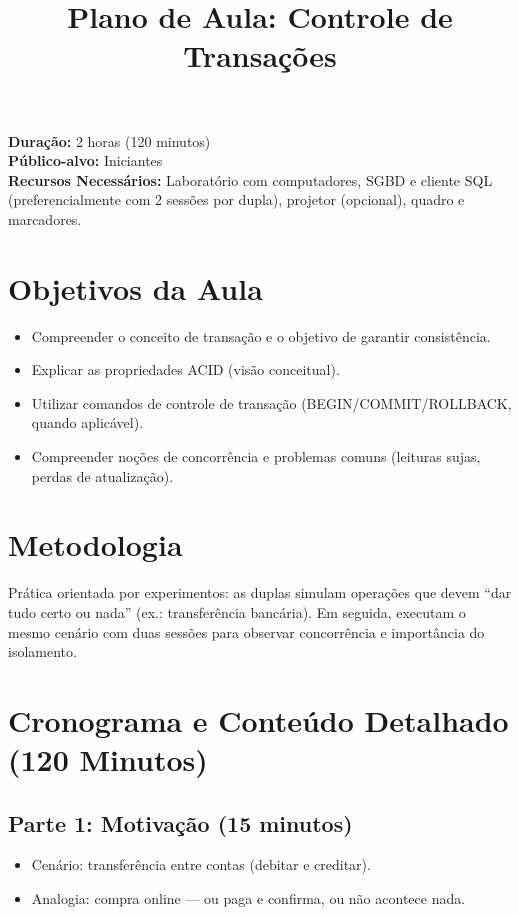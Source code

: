 \documentclass[12pt,a4paper]{article}
\title{Plano de Aula: Controle de Transações}
\date{}
\begin{document}
\maketitle

\noindent
\textbf{Duração:} 2 horas (120 minutos)\\
\textbf{Público-alvo:} Iniciantes\\
\textbf{Recursos Necessários:} Laboratório com computadores, SGBD e cliente SQL (preferencialmente com 2 sessões por dupla), projetor (opcional), quadro e marcadores.

\section{Objetivos da Aula}
\begin{itemize}[leftmargin=*,itemsep=0.25em]
  \item Compreender o conceito de transação e o objetivo de garantir consistência.
  \item Explicar as propriedades ACID (visão conceitual).
  \item Utilizar comandos de controle de transação (BEGIN/COMMIT/ROLLBACK, quando aplicável).
  \item Compreender noções de concorrência e problemas comuns (leituras sujas, perdas de atualização).
\end{itemize}

\section{Metodologia}
Prática orientada por experimentos: as duplas simulam operações que devem ``dar tudo certo ou nada'' (ex.: transferência bancária). Em seguida, executam o mesmo cenário com duas sessões para observar concorrência e importância do isolamento.

\section{Cronograma e Conteúdo Detalhado (120 Minutos)}
\subsection*{Parte 1: Motivação (15 minutos)}
\begin{itemize}[leftmargin=*,itemsep=0.35em]
  \item Cenário: transferência entre contas (debitar e creditar).
  \item Analogia: compra online --- ou paga e confirma, ou não acontece nada.
\end{itemize}
\end{document}
